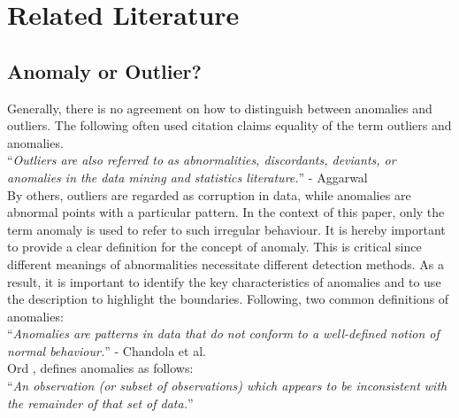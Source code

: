 
\chapter{Related Literature} \label{relatedLiterature} %

\label{2.} %


\section{Anomaly or Outlier?} \label{anomalies}

Generally, there is no agreement on how to distinguish between anomalies and outliers. The following often used citation claims equality of the term outliers and anomalies.\\

\noindent\enquote{\itshape Outliers are also referred to as abnormalities, discordants, deviants, or anomalies in the data mining
	and statistics literature.} - Aggarwal \parencite*{Aggarwal2013}\\

By others, outliers are regarded as corruption in data, while anomalies are abnormal points with a particular pattern. 
In the context of this paper, only the term anomaly is used to refer to such irregular behaviour. It is hereby important to provide a clear definition for the concept of anomaly. This is critical since different meanings of abnormalities necessitate different detection methods. As a result, it is important to identify the key characteristics of anomalies and to use the description to highlight the boundaries. Following, two common definitions of anomalies:\\

\noindent\enquote{\itshape Anomalies are patterns in data that do not conform to a well-defined notion of normal behaviour.} - Chandola et al. \parencite*{Chandola2009}\\

Ord \parencite*{Ord1996}, defines anomalies as follows:\\

\noindent\enquote{\itshape An observation (or subset of observations) which appears to be inconsistent with the remainder of that set of data.}\\

